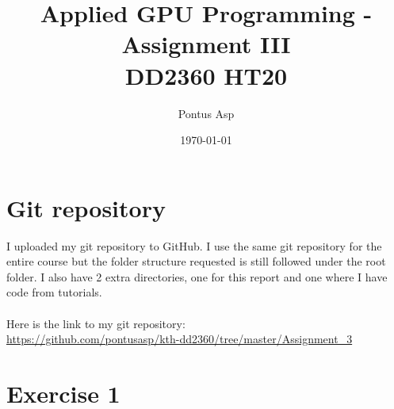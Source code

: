 \documentclass[a4paper, 12pt]{article}
\begin{document}
\title{\vspace{4.0cm}Applied GPU Programming - Assignment III\\
\large DD2360 HT20}
\author{Pontus Asp}
\date{\today}
\maketitle
\thispagestyle{empty}
\newpage

\clearpage
{}

\section{Git repository}
I uploaded my git repository to GitHub. I use the same git repository for the entire course but the folder structure requested is still followed under the root folder. I also have 2 extra directories, one for this report and one where I have code from tutorials.
\\\\
Here is the link to my git repository:\\
\url{https://github.com/pontusasp/kth-dd2360/tree/master/Assignment_3}





\section{Exercise 1}





\end{document}
